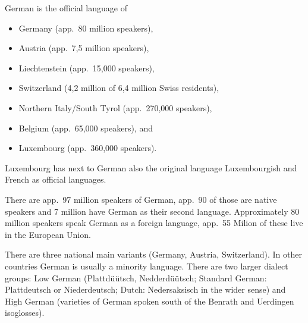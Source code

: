 German is the official language of
\begin{itemize}
\item Germany (app.\ 80 million speakers), 
\item Austria (app.\ 7,5 million speakers), 
\item Liechtenstein (app.\ 15,000 speakers), 
\item Switzerland (4,2 million of 6,4 million Swiss residents),
\item Northern Italy/South Tyrol (app.\ 270,000 speakers), 
\item Belgium (app.\ 65,000 speakers), and
\item Luxembourg (app.\ 360,000 speakers).
\end{itemize}
Luxembourg has next to German also the original language Luxembourgish and French as official
languages.

There are app.\ 97 million speakers of German, app.\, 90 of those are native speakers and 7 million
have German as their second language.
Approximately 80 million speakers speak German as a foreign language, app.\ 55 Milion of these live
in the European Union.

There are three national main variants (Germany, Austria, Switzerland). In other countries German is
usually a minority language. There are two larger dialect groups: Low German (Plattdüütsch,
Nedderdüütsch; Standard German: Plattdeutsch or Niederdeutsch; Dutch: Nedersaksisch in the wider
sense) and High German (varieties of German spoken south of the Benrath and Uerdingen isoglosses).





